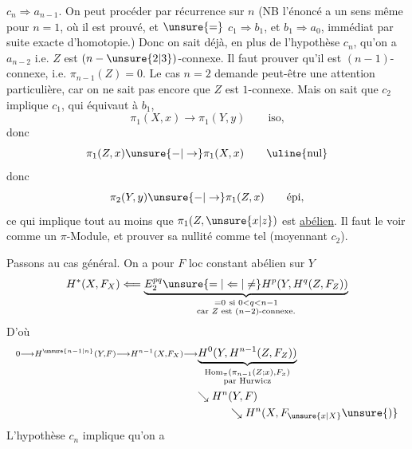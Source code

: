 $c_n\Rightarrow a_{n-1}$. On peut procéder par récurrence sur $n$ (NB l'énoncé a un sens même pour $n=1$, où il est prouvé, et $\unsure{=}$ $c_1\Rightarrow b_1$, et $b_1\Rightarrow a_0$,  immédiat par suite exacte d'homotopie.)
Donc on sait déjà, en plus de l'hypothèse $c_n$, qu'on a $a_{n-2}$ i.e. $Z$ est $(n-\unsure{2|3})$-connexe. Il faut prouver qu'il est \inserted{$\unsure{=}$} $(n-1)$-connexe, i.e. $\pi_{n-1}(Z)=0$. Le cas $n=2$ demande
peut-être une attention particulière, car on
ne sait pas \unsure{$=$} encore que $Z$ est $1$-connexe.
Mais  on sait que $c_2$ implique $c_1$, qui équivaut
à $b_1$, 
\[
 \pi_1(X,x)\longrightarrow\pi_1(Y,y)\qquad\text{iso,}
\]
donc
\[
 \pi_1(Z,x)\unsure{-|\to}\pi_1(X,x)\qquad\text{\uline{nul}}
\]
donc
\[
 \pi_2(Y,y)\unsure{-|\to}\pi_1(Z,x)\qquad\text{épi,}
\]
ce qui implique tout au moins que
$\pi_1(Z,\unsure{x|z})$ est \uline{abélien}.  Il faut le
voir comme un $\pi$-Module, et prouver
sa nullité comme tel (moyennant $c_2$).

Passons au cas général. On a pour $F$ loc
constant abélien sur $Y$
\[
 H^*(X,F_X)\Longleftarrow
 \underbrace{E_2^{pq}\unsure{=|\Leftarrow|\ne}H^p(Y,H^q(Z,F_Z))}
 _{\substack{=0\ \text{si }0<q<n-1\\\text{car }Z\text{ est }(n-2)\text{-connexe}.}}
\]
D'où
\[
 \begin{aligned}
 \scriptstyle 0\longrightarrow H^{\unsure{n-1|n}}(Y,F)\longrightarrow H^{n-1}(X,F_X)
 &\scriptstyle\longrightarrow\underbrace{H^0(Y,H^{n-1}(Z,F_Z))}
 _{\substack{\operatorname{Hom}_\pi(\pi_{n-1}(Z;x),F_x)\\\text{par Hurwicz}}}
 \\
 &\quad\searrow H^n(Y,F)\\
 &\qquad\qquad\searrow H^n(X,F_{\unsure{x|X}}\unsure{)}
 \end{aligned}
\]
L'hypothèse $c_n$ implique qu'on a
